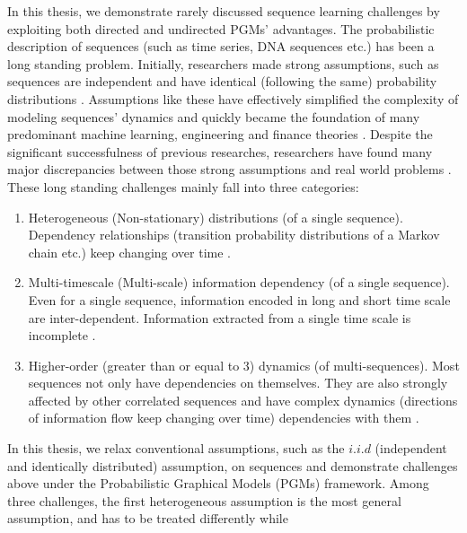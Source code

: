 In this thesis, we demonstrate rarely discussed sequence learning
challenges by exploiting both directed and undirected PGMs'
advantages. The probabilistic description of sequences (such as
time series, DNA sequences etc.) has been a long standing
problem. Initially, researchers made strong assumptions, such as
sequences are independent and have identical (following the same)
probability distributions
\cite{bachelier1900theorie,friedman1953methodology}. Assumptions
like these have effectively simplified the complexity of modeling
sequences' dynamics and quickly became the foundation of many
predominant machine learning, engineering and finance theories
\cite{jegadeesh1993returns,shiller1980stock,
  sharpe1964capital,carhart1997persistence,sargent1993bounded}.
Despite the significant successfulness of previous researches,
researchers have found many major discrepancies between those
strong assumptions and real world problems
\cite{lux2008markov,mandelbrot1963new,lux2007forecasting,
  abry2019shuffling, li2019multi, mandelbrot1997multifractal}.
These long standing challenges mainly fall into three categories:
%
\begin{enumerate}
\item Heterogeneous (Non-stationary) distributions (of a single
  sequence). Dependency relationships (\eg transition probability
  distributions of a Markov chain etc.) keep changing over time
  \cite{ross1996stochastic}.
\item Multi-timescale (Multi-scale) information dependency (of a
  single sequence). Even for a single sequence, information
  encoded in long and short time scale are inter-dependent.
  Information extracted from a single time scale is incomplete
  \cite{mandelbrot1997multifractal}.
\item Higher-order (greater than or equal to 3) dynamics (of
  multi-sequences). Most sequences not only have dependencies on
  themselves. They are also strongly affected by other correlated
  sequences and have complex dynamics (\eg directions of
  information flow keep changing over time) dependencies with
  them
  \cite{lo1990contrarian,badrinath1995shepherds,mcqueen1996delayed}.
\end{enumerate}
%
In this thesis, we relax conventional assumptions, such as the
$i.i.d$ (independent and identically distributed) assumption, on
sequences and demonstrate challenges above under the
Probabilistic Graphical Models (PGMs) framework. Among three
challenges, the first heterogeneous assumption is the most
general assumption, and has to be treated differently while

